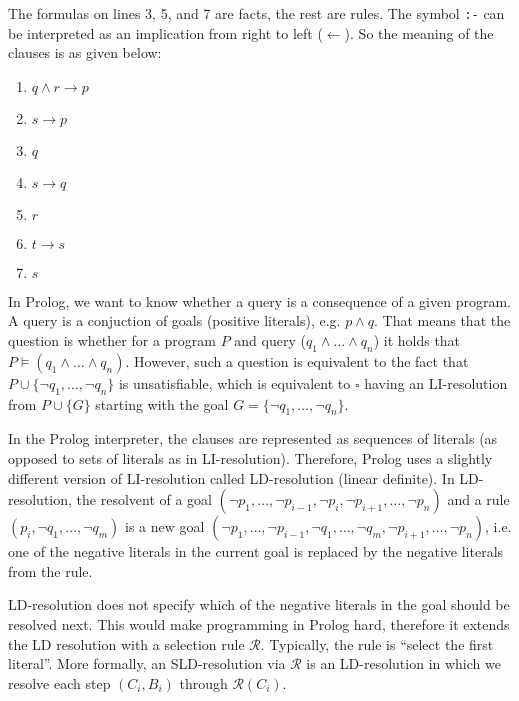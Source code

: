 The formulas on lines 3, 5, and 7 are facts, the rest are rules. The symbol \texttt{:-} can be interpreted as an implication from right to left ($\leftarrow$). So the meaning of the clauses is as given below:

\begin{multicols}{2}
\begin{enumerate}
  \item $q \land r \to p$
  \item $s \to p$
  \item $q$
  \item $s \to q$
  \columnbreak
  \item $r$
  \item $t \to s$
  \item $s$
\end{enumerate}
\end{multicols}

In Prolog, we want to know whether a query is a consequence of a given program. A query is a conjuction of goals (positive literals), e.g. $p \land q$. That means that the question is whether for a program $P$ and query ($q_1 \land \dots \land q_n$) it holds that $P \vDash (q_1 \land \dots \land q_n)$. However, such a question is equivalent to the fact that $P \cup \{\neg q_1, \dots, \neg q_n\}$ is unsatisfiable, which is equivalent to $\square$ having an LI-resolution from $P \cup \{G\}$ starting with the goal $G = \{\neg q_1, \dots, \neg q_n\}$.

In the Prolog interpreter, the clauses are represented as sequences of literals (as opposed to sets of literals as in LI-resolution). Therefore, Prolog uses a slightly different version of LI-resolution called LD-resolution (linear definite). In LD-resolution, the resolvent of a goal $(\neg p_1, \dots, \neg p_{i-1}, \neg p_i, \neg p_{i+1}, \dots, \neg p_n)$ and a rule $(p_i, \neg q_1, \dots, \neg q_m)$ is a new goal $(\neg p_1, \dots, \neg p_{i-1}, \neg q_1, \dots, \neg q_m, \neg p_{i+1}, \dots, \neg p_n)$, i.e. one of the negative literals in the current goal is replaced by the negative literals from the rule. 

LD-resolution does not specify which of the negative literals in the goal should be resolved next. This would make programming in Prolog hard, therefore it extends the LD resolution with a selection rule $\mathcal{R}$. Typically, the rule is ``select the first literal''. More formally, an SLD-resolution via $\mathcal{R}$ is an LD-resolution in which we resolve each step $(C_i, B_i)$ through $\mathcal{R}(C_i)$.

